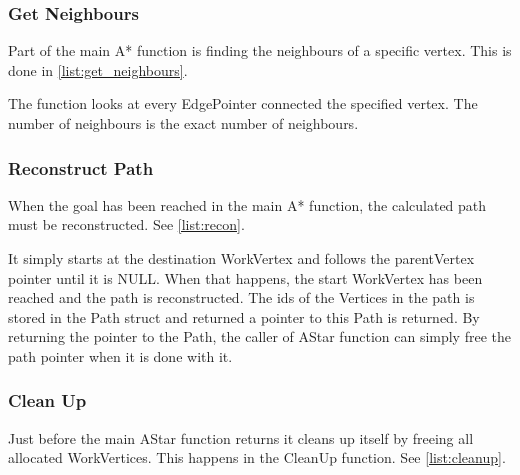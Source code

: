 \subsubsection{Get Neighbours}

Part of the main A* function is finding the neighbours of a specific vertex. This is done in \cref{list:get_neighbours}.

The function looks at every EdgePointer connected the specified vertex. The number of neighbours is the exact number of neighbours.



\subsubsection{Reconstruct Path}

When the goal has been reached in the main A* function, the calculated path must be reconstructed. See \cref{list:recon}.



It simply starts at the destination WorkVertex and follows the parentVertex pointer until it is NULL. When that happens, the start WorkVertex has been reached and the path is reconstructed. The ids of the Vertices in the path is stored in the Path struct and returned a pointer to this Path is returned. By returning the pointer to the Path, the caller of AStar function can simply free the path pointer when it is done with it.

\subsubsection{Clean Up}


Just before the main AStar function returns it cleans up itself by freeing all allocated WorkVertices. This happens in the CleanUp function. See \cref{list:cleanup}.

